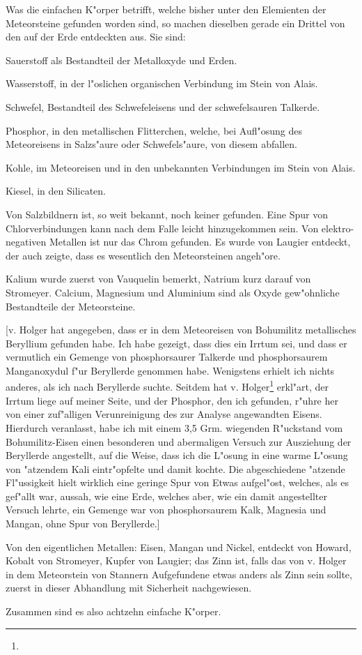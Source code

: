 \documentclass[a4paper, 11pt, oneside]{article}
\begin{document}
Was die einfachen K"orper betrifft, welche bisher unter den Elemienten der Meteorsteine gefunden worden sind, so machen dieselben gerade ein Drittel von den auf der Erde entdeckten aus. Sie sind:

Sauerstoff als Bestandteil der Metalloxyde und Erden.

Wasserstoff, in der l"oslichen organischen Verbindung im Stein von Alais.

Schwefel, Bestandteil des Schwefeleisens und der schwefelsauren Talkerde.

Phosphor, in den metallischen Flitterchen, welche, bei Aufl"osung des Meteoreisens in Salzs"aure oder Schwefels"aure, von diesem abfallen.

Kohle, im Meteoreisen und in den unbekannten Verbindungen im Stein von Alais.

Kiesel, in den Silicaten.

Von Salzbildnern ist, so weit bekannt, noch keiner gefunden. Eine Spur von Chlorverbindungen kann nach dem Falle leicht hinzugekommen sein. Von elektro-negativen Metallen ist nur das Chrom gefunden. Es wurde von Laugier entdeckt, der auch zeigte, dass es wesentlich den Meteorsteinen angeh"ore.

Kalium wurde zuerst von Vauquelin bemerkt, Natrium kurz darauf von Stromeyer. Calcium, Magnesium und Aluminium sind als Oxyde gew"ohnliche Bestandteile der Meteorsteine.

[v. Holger hat angegeben, dass er in dem Meteoreisen von Bohumilitz metallisches Beryllium gefunden habe. Ich habe gezeigt, dass dies ein Irrtum sei, und dass er vermutlich ein Gemenge von phosphorsaurer Talkerde und phosphorsaurem Manganoxydul f"ur Beryllerde genommen habe. Wenigstens erhielt ich nichts anderes, als ich nach Beryllerde suchte. Seitdem hat v. Holger\footnote{} erkl"art, der Irrtum liege auf meiner Seite, und der Phosphor, den ich gefunden, r"uhre her von einer zuf"alligen Verunreinigung des zur Analyse angewandten Eisens. Hierdurch veranlasst, habe ich mit einem 3,5 Grm. wiegenden R"uckstand vom Bohumilitz-Eisen einen besonderen und abermaligen Versuch zur Ausziehung der Beryllerde angestellt, auf die Weise, dass ich die L"osung in eine warme L"osung von "atzendem Kali eintr"opfelte und damit kochte. Die abgeschiedene "atzende Fl"ussigkeit hielt wirklich eine geringe Spur von Etwas aufgel"ost, welches, als es gef"allt war, aussah, wie eine Erde, welches aber, wie ein damit angestellter Versuch lehrte, ein Gemenge war von phosphorsaurem Kalk, Magnesia und Mangan, ohne Spur von Beryllerde.]

Von den eigentlichen Metallen: Eisen, Mangan und Nickel, entdeckt von Howard, Kobalt von Stromeyer, Kupfer von Laugier; das Zinn ist, falls das von v. Holger in dem Meteorstein von Stannern Aufgefundene etwas anders als Zinn sein sollte, zuerst in dieser Abhandlung mit Sicherheit nachgewiesen.

Zusammen sind es also achtzehn einfache K"orper.
\clearpage
\end{document}
